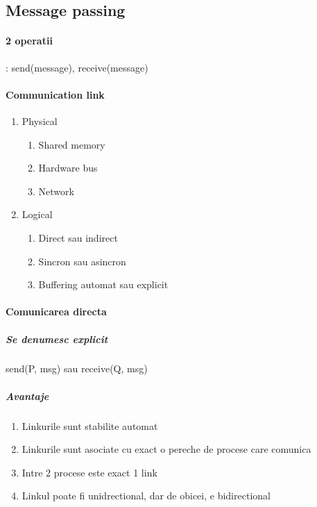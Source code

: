 \documentclass{article}
\begin{document}
\subsection*{Message passing}
\paragraph*{2 operatii}: send(message), receive(message)
\paragraph*{Communication link}
\begin{enumerate}
    \item Physical
    \begin{enumerate}
        \item Shared memory
        \item Hardware bus
        \item Network
    \end{enumerate}
    \item Logical
    \begin{enumerate}
        \item Direct sau indirect
        \item Sincron sau asincron
        \item Buffering automat sau explicit
    \end{enumerate}
\end{enumerate}

\paragraph*{Comunicarea directa}
\subparagraph*{Se denumesc explicit} send(P, msg) sau receive(Q, msg)
\subparagraph*{Avantaje}
\begin{enumerate}
    \item Linkurile sunt stabilite automat
    \item Linkurile sunt asociate cu exact o pereche de procese care comunica
    \item Intre 2 procese este exact 1 link
    \item Linkul poate fi unidrectional, dar de obicei, e bidirectional
\end{enumerate}
\end{document}
